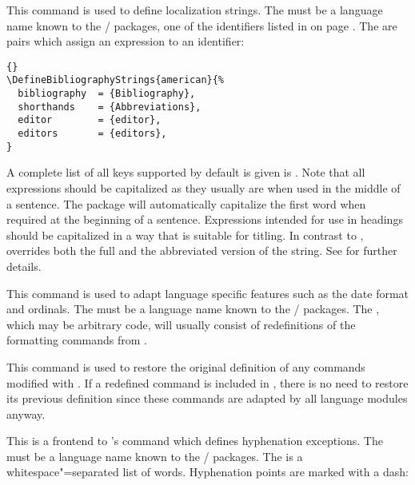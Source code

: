 \documentclass{ltxdockit}[2011/03/25]
\begin{document}
\begin{ltxsyntax}


This command is used to define localization strings. The  must be a language name known to the / packages, \ie one of the identifiers listed in  on page \pageref{bib:fld:tab1}. The  are \keyval pairs which assign an expression to an identifier:

\begin{lstlisting}[style=latex]{}
\DefineBibliographyStrings{american}{%
  bibliography  = {Bibliography},
  shorthands    = {Abbreviations},
  editor        = {editor},
  editors       = {editors},
}
\end{lstlisting}
%
A complete list of all keys supported by default is given is . Note that all expressions should be capitalized as they usually are when used in the middle of a sentence. The  package will automatically capitalize the first word when required at the beginning of a sentence. Expressions intended for use in headings should be capitalized in a way that is suitable for titling. In contrast to ,  overrides both the full and the abbreviated version of the string. See  for further details.


This command is used to adapt language specific features such as the date format and ordinals. The  must be a language name known to the / packages. The , which may be arbitrary \latex code, will usually consist of redefinitions of the formatting commands from .


This command is used to restore the original definition of any commands modified with . If a redefined command is included in , there is no need to restore its previous definition since these commands are adapted by all language modules anyway.


This is a \latex frontend to \tex's  command which defines hyphenation exceptions.
The  must be a language name known to the / packages. The  is a whitespace"=separated list of words. Hyphenation points are marked with a dash:


\end{ltxsyntax}
\end{document}
